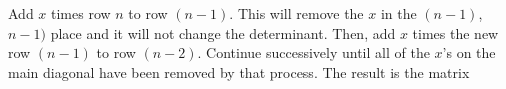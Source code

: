 Add \(x\) times row \(n\) to row \((n-1)\). This will remove the \(x\) in the \((n-1)\), \(n-1)\) place and it will not change the determinant. Then, add \(x\) times the new row \((n-1)\) to row \((n-2)\). Continue successively until all of the \(x\)'s on the main diagonal have been removed by that process. The result is the matrix 